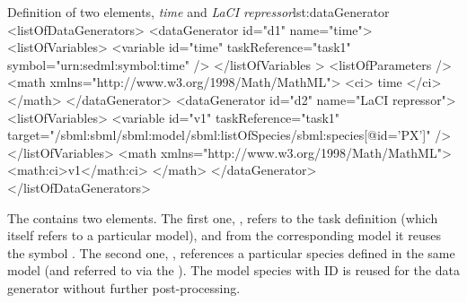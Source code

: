 \begin{myXmlLst}{Definition of two  elements, \emph{time} and \emph{LaCI repressor}}{lst:dataGenerator}
<listOfDataGenerators>
	<dataGenerator id="d1" name="time">
		<listOfVariables>
			<variable id="time" taskReference="task1" symbol="urn:sedml:symbol:time" />
		</listOfVariables >
		<listOfParameters />
		<math xmlns="http://www.w3.org/1998/Math/MathML">
			<ci> time </ci>
		</math>
	</dataGenerator>
	<dataGenerator id="d2" name="LaCI repressor">
		<listOfVariables>
			<variable id="v1" taskReference="task1" 
				target="/sbml:sbml/sbml:model/sbml:listOfSpecies/sbml:species[@id='PX']" />
		</listOfVariables>
		<math xmlns="http://www.w3.org/1998/Math/MathML">
			<math:ci>v1</math:ci>
		</math>
	</dataGenerator>
</listOfDataGenerators>
\end{myXmlLst}

The  contains two  elements. 
The first one, , refers to the task definition  (which itself refers to a particular model), and from the corresponding model it reuses the symbol .
The second one, , references a particular species defined in the same model (and referred to via the ). The model species with ID  is reused for the data generator  without further post-processing.
